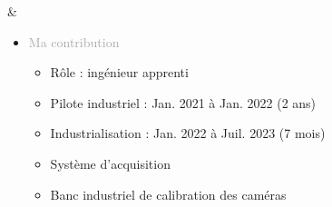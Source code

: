 \documentclass{article}
\begin{document}
\begin{tabular}
    &
    \begin{itemize}[label={}, topsep=8pt, partopsep=0pt, itemsep=0.5pt, parsep=2pt, after=\vspace*{-\baselineskip}]
        \setlength{\itemsep}{10pt} 
        \item \textcolor{darkGray}{Ma contribution}
        \begin{itemize}[label={\textcolor{gray!100}{\checkmark}}, topsep=8pt, partopsep=0pt, itemsep=0.5pt, parsep=2pt] 
            \item \textcolor{gray!100}{Rôle : ingénieur apprenti}
            \item \textcolor{gray!100}{Pilote industriel : Jan. 2021 à Jan. 2022 (2 ans)}
            \item \textcolor{gray!100}{Industrialisation : Jan. 2022 à Juil. 2023 (7 mois)}
            \item \textcolor{gray!100}{Système d'acquisition}
            \item \textcolor{gray!100}{Banc industriel de calibration des caméras}
        \end{itemize}
    \end{itemize}
\end{tabular}

\begin{center}
\end{center}
\end{document}
